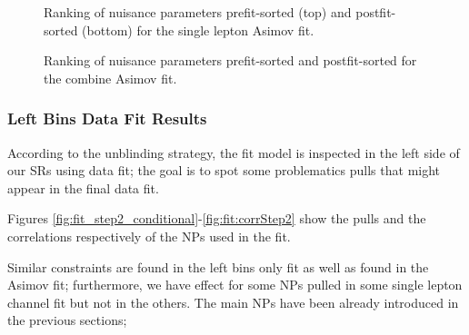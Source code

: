 \begin{figure}[h]
  \centering
  \caption{Ranking of nuisance parameters prefit-sorted (top) and postfit-sorted (bottom) for the single lepton Asimov fit.}
  \label{fig:fit:rankSingleStep1}
\end{figure}

\begin{figure}[h]
  \centering
  \caption{Ranking of nuisance parameters prefit-sorted and postfit-sorted for the combine Asimov fit.}
  \label{fig:fit:rankCombineStep1}
\end{figure}



\clearpage
\subsubsection{Left Bins Data Fit Results}

According to the unblinding strategy, the fit model is inspected in the left side of our SRs using data fit; 
the goal is to spot some problematics pulls that might appear in the final data fit.

Figures \ref{fig:fit_step2_conditional}-\ref{fig:fit:corrStep2}
show the pulls and the correlations respectively of the NPs used in the fit.

Similar constraints are found in the left bins only fit as well as found in the Asimov fit;
furthermore, we have effect for some NPs pulled in some single lepton channel fit but not in the others. 
The main NPs have been already introduced in the previous sections;

